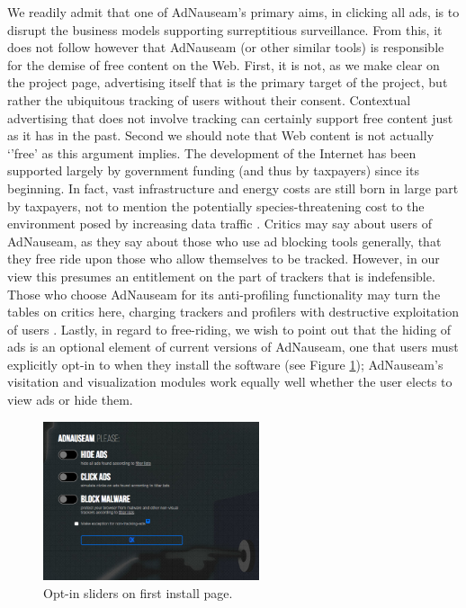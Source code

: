 \documentclass[conference]{IEEEtran}
\begin{document}
We readily admit that one of AdNauseam's primary aims, in clicking all ads, is to disrupt the business models supporting surreptitious surveillance. From this, it does not follow however that AdNauseam (or other similar tools) is responsible for the demise of free content on the Web. First, it is not, as we make clear on the project page, advertising itself that is the primary target of the project, but rather the ubiquitous tracking of users without their consent. Contextual advertising that does not involve tracking can certainly support free content just as it has in the past. Second we should note that Web content is not actually `'free' as this argument implies. The development of the Internet has been supported largely by government funding (and thus by taxpayers) since its beginning. In fact, vast infrastructure and energy costs are still born in large part by taxpayers, not to mention the potentially species-threatening cost to the environment posed by increasing data traffic \cite{Hazas}. Critics may say about users of AdNauseam, as they say about those who use ad blocking tools generally, that they free ride upon those who allow themselves to be tracked. However, in our view this presumes an entitlement on the part of trackers that is indefensible. Those who choose AdNauseam for its anti-profiling functionality may turn the tables on critics here, charging  trackers and profilers with destructive exploitation of users \cite{Brunton}. Lastly, in regard to free-riding, we wish to point out that the hiding of ads is an optional element of current versions of AdNauseam, one that users must explicitly opt-in to when they install the software (see Figure \ref{fig:firstrun}); AdNauseam's visitation and visualization modules work equally well whether the user elects to view ads or hide them.

\begin{figure}[!t]
\centering
\includegraphics[width=2.5in]{images/firstrun.png}
\caption{Opt-in sliders on first install page.}
\label{fig:firstrun}
\end{figure}
\end{document}
